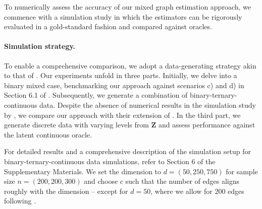 To numerically assess the accuracy of our mixed graph estimation approach, we commence with a simulation study in which the estimators can be rigorously evaluated in a gold-standard fashion and compared against oracles.
\paragraph{Simulation strategy.}
To enable a comprehensive comparison, we adopt a data-generating strategy akin to that of \cite{Fan17}. Our experiments unfold in three parts. Initially, we delve into a binary mixed case, benchmarking our approach against scenarios c) and d) in Section 6.1 of \cite{Fan17}. Subsequently, we generate a combination of binary-ternary-continuous data. Despite the absence of numerical results in the simulation study by \citet{Quan18}, we compare our approach with their extension of \citet{Fan17}. In the third part, we generate discrete data with varying levels from $\mathbf{Z}$ and assess performance against the latent continuous oracle.

For detailed results and a comprehensive description of the simulation setup for binary-ternary-continuous data simulations, refer to Section 6 of the Supplementary Materials. We set the dimension to $d = (50, 250, 750)$ for sample size $n = (200, 200, 300)$ and choose $c$ such that the number of edges aligns roughly with the dimension -- except for $d = 50$, where we allow for $200$ edges following \citet{Fan17}.

